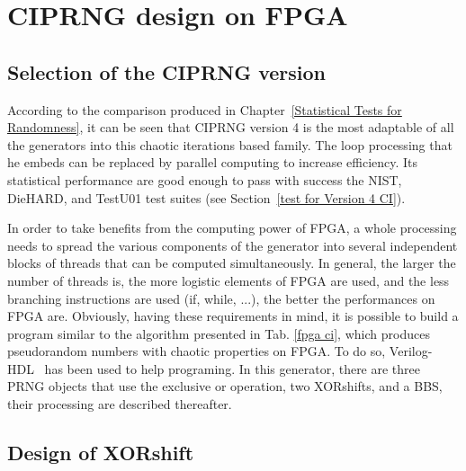 \section{CIPRNG design on FPGA}
\label{FPGA design}
\subsection{Selection of the CIPRNG version}

According to the comparison produced in Chapter~\ref{Statistical Tests for Randomness}, 
it can be seen that CIPRNG version 4 is the most adaptable of all the generators into
this chaotic iterations based family. 
The loop processing that he embeds can be replaced by parallel computing to increase  efficiency. 
Its statistical performance are good enough to pass with success the NIST, DieHARD, and TestU01 test suites (see Section~\ref{test for Version 4 CI}).

In order to take benefits from the computing power of FPGA, a whole processing
needs to spread the various components of the generator 
into several independent blocks  of threads that can be computed
simultaneously. In general,  the larger the number of  threads is, the
more logistic elements of FPGA are used, and the less branching  instructions are
used  (if,  while,  ...),  the  better the  performances  on  FPGA  are.
Obviously, having these requirements in  mind, it is possible to build
a program similar to the algorithm presented in Tab.
\ref{fpga ci}, which produces pseudorandom numbers with chaotic properties on FPGA.  
To do so,  Verilog-HDL~\cite{verilog} has been used to help programing. 
In this generator, there are three
PRNG objects that use the exclusive or operation, two XORshifts, and a BBS, 
their processing are described thereafter.


\subsection{Design of XORshift}

